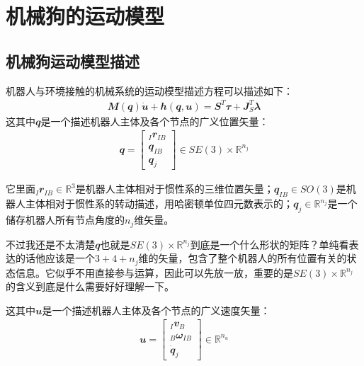 
\chapter{机械狗的运动模型}

\section{机械狗运动模型描述}

机器人与环境接触的机械系统的运动模型描述方程可以描述如下\cite{zhangkun1994}：
\begin{align}
    {\mathbfit M}({\mathbfit q})\dot{\mathbfit u} + {\mathbfit h}({\mathbfit q}, {\mathbfit u}) =  {\mathbfit S}^T{\mathbfit \tau} + {\mathbfit J}_S^T {\mathbfit \lambda}
\end{align}
这其中${\mathbfit q}$是一个描述机器人主体及各个节点的广义位置矢量：
\begin{align}
    {\mathbfit q}= \begin{bmatrix}_I {\mathbfit r}_{IB} \\ {\mathbfit q}_{IB} \\ {\mathbfit q}_j\end{bmatrix} \in SE(3)\times {\mathbb R}^{n_j}
\end{align}

它里面$_I {\mathbfit r}_{IB} \in {\mathbb R}^{3}$是机器人主体相对于惯性系的三维位置矢量；${\mathbfit q}_{IB} \in SO(3)$是机器人主体相对于惯性系的转动描述，用哈密顿单位四元数表示的；${\mathbfit q}_j \in {\mathbb R}^{n_j}$是一个储存机器人所有节点角度的$n_j$维矢量。

\begin{note}
    不过我还是不太清楚$\mathbfit q$也就是$SE(3)\times {\mathbb R}^{n_j}$到底是一个什么形状的矩阵？单纯看表达的话他应该是一个$3+4+n_j$维的矢量，包含了整个机器人的所有位置有关的状态信息。它似乎不用直接参与运算，因此可以先放一放，重要的是$SE(3)\times {\mathbb R}^{n_j}$的含义到底是什么需要好好理解一下。
\end{note}

这其中${\mathbfit u}$是一个描述机器人主体及各个节点的广义速度矢量：
\begin{align}
    {\mathbfit u}= \begin{bmatrix}_I{\mathbfit v}_B \\ _B{\mathbfit \omega}_{IB} \\ \dot {\mathbfit q}_j \end{bmatrix} \in {\mathbb R}^{n_u} 
\end{align}

